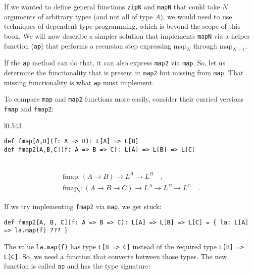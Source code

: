 If we wanted to define general functions \lstinline!zipN! and \lstinline!mapN!
that could take $N$ arguments of arbitrary types (and not all of
type $A$), we would need to use techniques of dependent-type programming,
which is beyond the scope of this book. We will now describe a simpler
solution that implements \lstinline!mapN! via a helper function (\lstinline!ap!)
that performs a recursion step expressing $\text{map}_{N}$ through
$\text{map}_{N-1}$.

If the \lstinline!ap! method can do that, it can also express \lstinline!map2!
via \lstinline!map!. So, let us determine the functionality that
is present in \lstinline!map2! but missing from \lstinline!map!.
That missing functionality is what \lstinline!ap! must implement.

To compare \lstinline!map! and \lstinline!map2! functions more easily,
consider their curried versions \lstinline!fmap! and \lstinline!fmap2!:

\begin{wrapfigure}{l}{0.543\columnwidth}%
\vspace{-0.8\baselineskip}
\begin{lstlisting}
def fmap[A,B](f: A => B): L[A] => L[B]
def fmap2[A,B,C](f: A => B => C): L[A] => L[B] => L[C]
\end{lstlisting}

\vspace{-1.45\baselineskip}
\end{wrapfigure}%

~\vspace{-1.75\baselineskip}
\begin{align*}
 & \text{fmap}:\left(A\rightarrow B\right)\rightarrow L^{A}\rightarrow L^{B}\quad,\\
 & \text{fmap}_{2}:\left(A\rightarrow B\rightarrow C\right)\rightarrow L^{A}\rightarrow L^{B}\rightarrow L^{C}\quad.
\end{align*}
\vspace{-1.7\baselineskip}

If we try implementing \lstinline!fmap2! via \lstinline!map!, we
get stuck:
\begin{lstlisting}
def fmap2[A, B, C](f: A => B => C): L[A] => L[B] => L[C] = { la: L[A] => la.map(f) ??? }
\end{lstlisting}
The value \lstinline!la.map(f)! has type \lstinline!L[B => C]! instead
of the required type \lstinline!L[B] => L[C]!. So, we need a function
that converts between those types. The new function is called \lstinline!ap!
and has the type signature:

